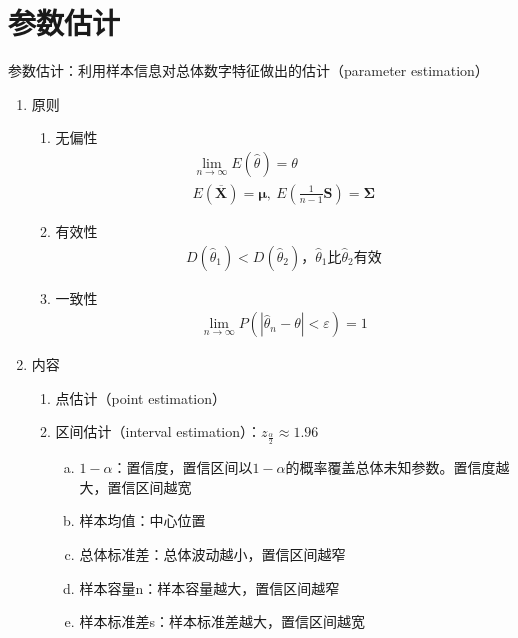 \documentclass[12pt]{book}
\begin{document}
\chapter{参数估计}

参数估计：利用样本信息对总体数字特征做出的估计（parameter estimation）
\\

\begin{enumerate}[1.]
    \item 原则
          \begin{enumerate}[(1)]
              \item 无偏性
                    \begin{gather*}
                        \lim_{n→\infty}{E(\hat{\theta})=\theta } \\
                        E\left(\overline{\bm{X}}\right)=\bm{\mu},\ E\left(\frac{1}{n-1}\bm{S}\right)=\bm{\Sigma}
                    \end{gather*}
              \item 有效性
                    \begin{gather*}
                        D(\hat{\theta}_1)<D(\hat{\theta}_2)，\hat{\theta}_1比\hat{\theta}_2有效
                    \end{gather*}
              \item 一致性
                    \begin{gather*}
                        \lim_{n\rightarrow\infty}{P\left({\left|{\hat{\theta}}_n-\theta\right|<\varepsilon}\right)}=1
                    \end{gather*}
          \end{enumerate}
    \item 内容
          \begin{enumerate}[(1)]
              \item 点估计（point estimation）
              \item 区间估计（interval estimation）：$z_{\frac{\alpha}{2}}\approx 1.96$
                    \begin{enumerate}[a.]
                        \item $1-\alpha$：置信度，置信区间以$1-\alpha$的概率覆盖总体未知参数。置信度越大，置信区间越宽
                        \item 样本均值：中心位置
                        \item 总体标准差：总体波动越小，置信区间越窄
                        \item 样本容量n：样本容量越大，置信区间越窄
                        \item 样本标准差s：样本标准差越大，置信区间越宽
                    \end{enumerate}
          \end{enumerate}
\end{enumerate}
\end{document}
